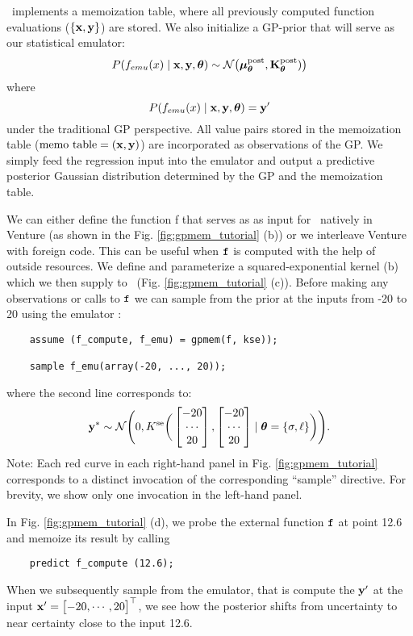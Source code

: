 \gpmem\ implements a memoization table, where all previously
computed function evaluations ($\{\mathbf{x},\mathbf{y}\}$) are stored. We also initialize a \ac{GP}-prior that
will serve as our statistical emulator:
\[
P(f_{emu}(x) \mid \mathbf{x},\mathbf{y},\bm{\theta})\sim
\mathcal{N}\big(\bm{\mu}_{\bm{\theta}}^\text{post},\mathbf{K}_{\bm{\theta}}^\text{post})\big)
\]
where 
\[
P(f_{emu}(x) \mid \mathbf{x},\mathbf{y},\bm{\theta}) = \mathbf{y}^\prime 
\]
under the traditional \ac{GP} perspective.
All value pairs stored in the memoization table ($\text{memo table} = (\mathbf{x},\mathbf{y})$) are incorporated as observations of
the \ac{GP}.
We simply feed the regression input
into the emulator and output a predictive posterior Gaussian distribution determined by the \ac{GP} and
the memoization table.

We can either define the function f that serves as as input for \gpmem\
 natively in Venture
(as shown in the Fig. \ref{fig:gpmem_tutorial} (b)) or we interleave Venture with foreign code. 
This can be useful when $\texttt{f}$ is computed with the help of outside resources.
We define and parameterize a squared-exponential kernel (b) which we then supply to
\gpmem\ (Fig. \ref{fig:gpmem_tutorial} (c)).
Before making any observations or calls to $\texttt{f}$
we can sample from the prior at the inputs from -20 to 20 using the emulator :
    \begin{lstlisting}
    assume (f_compute, f_emu) = gpmem(f, kse));

    sample f_emu(array(-20, ..., 20));
    \end{lstlisting}
where the second line corresponds to:
\[ 
\mathbf{y}^* \sim \mathcal{N}\Bigg(0,K^\text{se}\bigg(
\begin{bmatrix} 
-20 \\
\cdots \\
20
 \end{bmatrix},
\begin{bmatrix} 
-20 \\
\cdots \\
20
 \end{bmatrix}
\mid \bm{\theta}=\{\sigma,\ell\}
\bigg)
\Bigg).
\]
Note: Each red curve in each right-hand panel in
Fig. \ref{fig:gpmem_tutorial} corresponds to a distinct invocation of
the corresponding ``sample'' directive.  For brevity, we show only one
invocation in the left-hand panel.

In Fig. \ref{fig:gpmem_tutorial} (d), we probe the external function $\texttt{f}$ at point 12.6 and memoize its result by calling 
   \begin{lstlisting}
    predict f_compute (12.6);
    \end{lstlisting}
When we subsequently sample from the emulator, that is compute the $\mathbf{y}^\prime$ at the input
$\mathbf{x}^\prime= \begin{bmatrix} -20, \cdots, 20 \end{bmatrix}^\top$, we see how the posterior shifts from uncertainty to near certainty close to the input 12.6.

